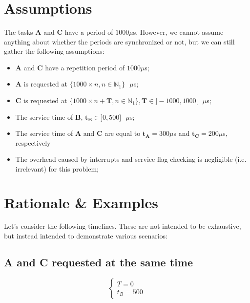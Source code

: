 \documentclass{article}
\begin{document}
\section{Assumptions}
\paragraph{}

The tasks \textbf{A} and \textbf{C} have a period of $1000 \mu$s. However, we cannot assume anything about whether the periods are synchronized or not, but we can still gather the following assumptions:

\begin{itemize}
  \item \textbf{A} and \textbf{C} have a repetition period of $1000 \mu$s;
  \item \textbf{A} is requested at $\{1000 \times n, n \in \mathbb{N}_1\}\text{ }\mu$s;
  \item \textbf{C} is requested at $\{1000 \times n + \mathbf{T}, n \in \mathbb{N}_1\}, \mathbf{T} \in \mathbf{]}-1000, 1000\mathbf{[}\text{ }\mu$s;
  \item The service time of \textbf{B}, $\mathbf{t_B} \in \mathbf{]}0, 500\mathbf{]}\text{ }\mu$s;
  \item The service time of \textbf{A} and \textbf{C} are equal to $\mathbf{t_A} = 300\mu$s and $\mathbf{t_C} = 200\mu$s, respectively
  \item The overhead caused by interrupts and service flag checking is negligible (i.e. irrelevant) for this problem; 
\end{itemize}

\section{Rationale \& Examples}
\paragraph{}

Let's consider the following timelines. These are not intended to be exhaustive, but instead intended to demonstrate various scenarios:

\subsection{A and C requested at the same time}

$$
\begin{cases}
    T = 0\\
    t_B = 500
\end{cases}
$$
\end{document}
